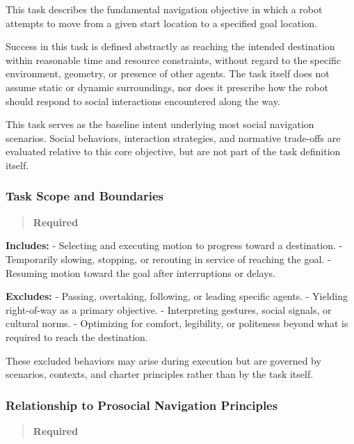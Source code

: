 \documentclass[utf8]{frontiers_suppmat} %
\begin{document}
This task describes the fundamental navigation objective in which a
robot attempts to move from a given start location to a specified goal
location.

Success in this task is defined abstractly as reaching the intended
destination within reasonable time and resource constraints, without
regard to the specific environment, geometry, or presence of other
agents. The task itself does not assume static or dynamic surroundings,
nor does it prescribe how the robot should respond to social
interactions encountered along the way.

This task serves as the baseline intent underlying most social
navigation scenarios. Social behaviors, interaction strategies, and
normative trade-offs are evaluated relative to this core objective, but
are not part of the task definition itself.

\subsubsection{Task Scope and Boundaries}\label{task-scope-and-boundaries}

\begin{quote}
\textbf{Required}
\end{quote}

\textbf{Includes:} - Selecting and executing motion to progress toward a
destination. - Temporarily slowing, stopping, or rerouting in service of
reaching the goal. - Resuming motion toward the goal after interruptions
or delays.

\textbf{Excludes:} - Passing, overtaking, following, or leading specific
agents. - Yielding right-of-way as a primary objective. - Interpreting
gestures, social signals, or cultural norms. - Optimizing for comfort,
legibility, or politeness beyond what is required to reach the
destination.

These excluded behaviors may arise during execution but are governed by
scenarios, contexts, and charter principles rather than by the task
itself.

\subsubsection{Relationship to Prosocial Navigation
Principles}\label{relationship-to-prosocial-navigation-principles}

\begin{quote}
\textbf{Required}
\end{quote}
\end{document}
